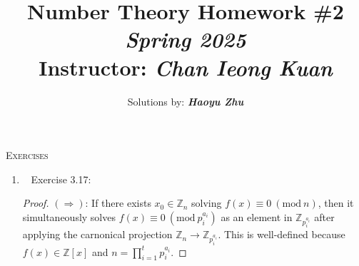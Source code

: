 \documentclass[11pt]{article}
\newcommand\0{\mathbf{0}}
\newcommand\ZZ{\mathbb{Z}}
\newcommand\<{\langle}
\renewcommand\>{\rangle}
\renewcommand\mod[1]{\ (\mathrm{mod}\ #1)}
\begin{document}


\title{\textbf{Number Theory Homework \#2} \textit{Spring 2025}\\\normalsize
	Instructor: \textit{Chan Ieong Kuan}\\[-2ex]}
\author{Solutions by: \textit{\textbf{Haoyu Zhu}}\\[2ex]}
\date{}
\maketitle

\vspace{-5ex}%

\noindent
\textsc{Exercises}
\begin{enumerate}
\section{Congruence}
\item\ \label{CRT}
Exercise 3.17:
\begin{proof}
  $(\Rightarrow)$: If there exists $x_0 \in \ZZ_n$ solving $f(x) \equiv 0 \mod{n}$, then it simultaneously solves $f(x) \equiv 0 \mod{p_i^{a_i}}$ as an element in $\ZZ_{p_i^{a_i}}$ after applying the carnonical projection $\ZZ_n \to \ZZ_{p_i^{a_i}}$. This is well-defined because $f(x) \in \ZZ[x]$ and $n = \displaystyle\prod_{i=1}^{t}{p_i^{a_i}}.$


\end{proof}
\end{enumerate}
\end{document}
